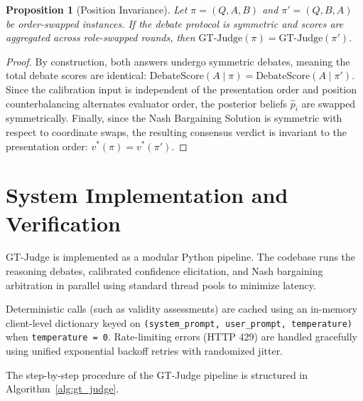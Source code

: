 \documentclass[11pt,a4paper]{article}
\newtheorem{proposition}{Proposition}
\begin{document}
\begin{proposition}[Position Invariance]
Let $\pi = (Q, A, B)$ and $\pi' = (Q, B, A)$ be order-swapped instances. If the debate protocol is symmetric and scores are aggregated across role-swapped rounds, then $\text{GT-Judge}(\pi) = \text{GT-Judge}(\pi')$.
\end{proposition}
\begin{proof}
By construction, both answers undergo symmetric debates, meaning the total debate scores are identical: $\text{DebateScore}(A \mid \pi) = \text{DebateScore}(A \mid \pi')$. Since the calibration input is independent of the presentation order and position counterbalancing alternates evaluator order, the posterior beliefs $\hat{p}_i$ are swapped symmetrically. Finally, since the Nash Bargaining Solution is symmetric with respect to coordinate swaps, the resulting consensus verdict is invariant to the presentation order: $v^*(\pi) = v^*(\pi')$.
\end{proof}

\section{System Implementation and Verification}
GT-Judge is implemented as a modular Python pipeline. The codebase runs the reasoning debates, calibrated confidence elicitation, and Nash bargaining arbitration in parallel using standard thread pools to minimize latency. 

Deterministic calls (such as validity assessments) are cached using an in-memory client-level dictionary keyed on \texttt{(system\_prompt, user\_prompt, temperature)} when \texttt{temperature = 0}. Rate-limiting errors (HTTP 429) are handled gracefully using unified exponential backoff retries with randomized jitter.

The step-by-step procedure of the GT-Judge pipeline is structured in Algorithm~\ref{alg:gt_judge}.
\end{document}
